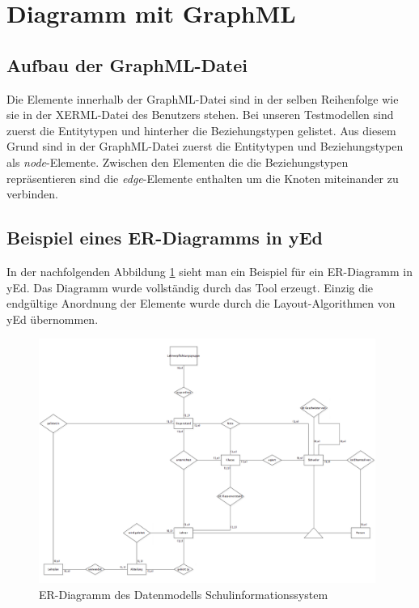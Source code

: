 \section{Diagramm mit GraphML}
\prc

\subsection{Aufbau der GraphML-Datei}

Die Elemente innerhalb der GraphML-Datei sind in der selben Reihenfolge wie sie in der XERML-Datei des Benutzers stehen. Bei unseren Testmodellen sind zuerst die Entitytypen und hinterher die Beziehungstypen gelistet. Aus diesem Grund sind in der GraphML-Datei zuerst die Entitytypen und Beziehungstypen als \textit{node}-Elemente. Zwischen den Elementen die die Beziehungstypen repräsentieren sind die \textit{edge}-Elemente enthalten um die Knoten miteinander zu verbinden.

\subsection{Beispiel eines ER-Diagramms in yEd}

In der nachfolgenden Abbildung \ref{yedERD} sieht man ein Beispiel für ein ER-Diagramm in yEd. Das Diagramm wurde vollständig durch das Tool erzeugt. Einzig die endgültige Anordnung der Elemente wurde durch die Layout-Algorithmen von yEd übernommen.

\begin{figure}[!h]
	\begin{center}
		\includegraphics[width=11cm]{images/yedERD.png}
		\caption{ER-Diagramm des Datenmodells Schulinformationssystem}
		\label{yedERD}
	\end{center}
\end{figure}